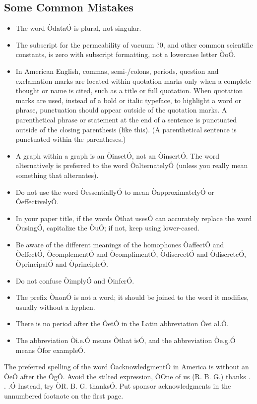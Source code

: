 \documentclass[a4paper, 10pt, conference]{ieeeconf}      %
\begin{document}
\subsection{Some Common Mistakes}
\begin{itemize}
	
	
	\item The word ÒdataÓ is plural, not singular.
	\item The subscript for the permeability of vacuum ?0, and other common scientific constants, is zero with subscript formatting, not a lowercase letter ÒoÓ.
	\item In American English, commas, semi-/colons, periods, question and exclamation marks are located within quotation marks only when a complete thought or name is cited, such as a title or full quotation. When quotation marks are used, instead of a bold or italic typeface, to highlight a word or phrase, punctuation should appear outside of the quotation marks. A parenthetical phrase or statement at the end of a sentence is punctuated outside of the closing parenthesis (like this). (A parenthetical sentence is punctuated within the parentheses.)
	\item A graph within a graph is an ÒinsetÓ, not an ÒinsertÓ. The word alternatively is preferred to the word ÒalternatelyÓ (unless you really mean something that alternates).
	\item Do not use the word ÒessentiallyÓ to mean ÒapproximatelyÓ or ÒeffectivelyÓ.
	\item In your paper title, if the words Òthat usesÓ can accurately replace the word ÒusingÓ, capitalize the ÒuÓ; if not, keep using lower-cased.
	\item Be aware of the different meanings of the homophones ÒaffectÓ and ÒeffectÓ, ÒcomplementÓ and ÒcomplimentÓ, ÒdiscreetÓ and ÒdiscreteÓ, ÒprincipalÓ and ÒprincipleÓ.
	\item Do not confuse ÒimplyÓ and ÒinferÓ.
	\item The prefix ÒnonÓ is not a word; it should be joined to the word it modifies, usually without a hyphen.
	\item There is no period after the ÒetÓ in the Latin abbreviation Òet al.Ó.
	\item The abbreviation Òi.e.Ó means Òthat isÓ, and the abbreviation Òe.g.Ó means Òfor exampleÓ.
	
\end{itemize}

The preferred spelling of the word ÒacknowledgmentÓ in America is without an ÒeÓ after the ÒgÓ. Avoid the stilted expression, ÒOne of us (R. B. G.) thanks . . .Ó  Instead, try ÒR. B. G. thanksÓ. Put sponsor acknowledgments in the unnumbered footnote on the first page.
\end{document}
